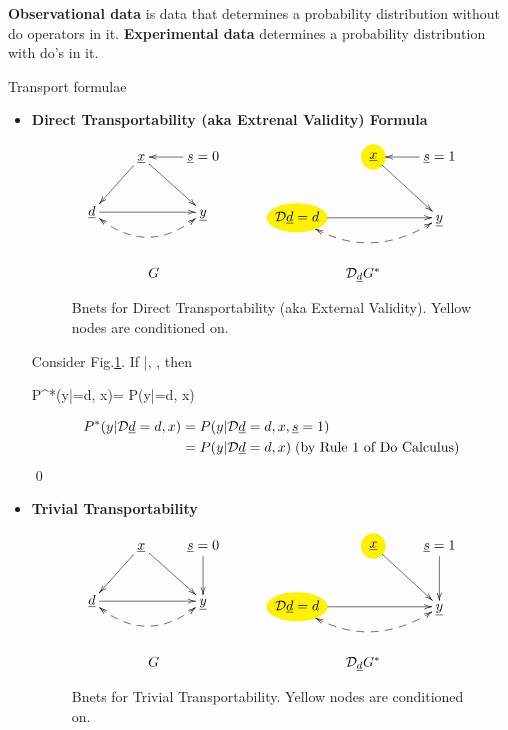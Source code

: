 {\bf Observational data} is data that
determines a probability distribution
without do operators in it.
 {\bf Experimental data} 
determines a probability distribution
 with do's in it.




Transport formulae

\begin{itemize}
\item{\bf Direct Transportability 
(aka Extrenal Validity) Formula}

\begin{figure}[h!]
$$
\begin{array}{ccc}
\xymatrix{
&\rvx\ar[ld]\ar[rd]
&\rvs=0\ar[l]
\\
\rvd\ar[rr]\ar@{<-->}@/_1.5pc/[rr]
&&\rvy
}
&
\;\;\;\;
&
\xymatrix{
&*++[o][F*:yellow]{\rvx}\ar[rd]
&\rvs=1\ar[l]
\\
*++[o][F*:yellow]{\cald\rvd=d}\ar[rr]
\ar@{<-->}@/_1.5pc/[rr]
&&\rvy
}
\\
\\
\\
G&&\cald_\rvd G^*
\end{array}
$$
\caption{Bnets for Direct Transportability
(aka External Validity).
Yellow nodes are conditioned on.}
\label{fig-direct-trans}
\end{figure}

\begin{claim} Consider Fig.\ref{fig-direct-trans}. If 
\beq
\rvy\perp \rvs|\rvx, \rvd
\;\;\;\;
\;,
\eeq
then

\beq
P^*(y|\cald\rvd=d, x)=
P(y|\cald\rvd=d, x)
\eeq
\end{claim}
\proof
\begin{align}
P^*(y|{\cal D}{\underline{d}}=d, x)
&=
P(y|{\cal D}{\underline{d}}=d, x, {\underline{s}}=1)
\\
&=
P(y|{\cal D}{\underline{d}}=d, x)\;\text{(by Rule 1 of Do Calculus)}
\end{align}
\qed
\item {\bf Trivial Transportability}

\begin{figure}[h!]
$$
\begin{array}{ccc}
\xymatrix{
&\rvx\ar[ld]\ar[rd]
&\rvs=0\ar[d]
\\
\rvd\ar[rr]\ar@{<-->}@/_1.5pc/[rr]
&&\rvy
}
&
\;\;\;\;
&
\xymatrix{
&*++[o][F*:yellow]{\rvx}\ar[rd]
&\rvs=1\ar[d]
\\
*++[o][F*:yellow]{\cald\rvd=d}\ar[rr]
\ar@{<-->}@/_1.5pc/[rr]
&&\rvy
}
\\
\\
\\
G&&\cald_\rvd G^*
\end{array}
$$
\caption{Bnets for Trivial Transportability.
Yellow nodes are conditioned on.}
\label{fig-trivial-trans}
\end{figure}


\end{itemize}
